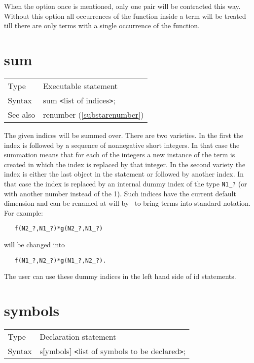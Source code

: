 When the option once is mentioned, only one pair will be contracted this 
way. Without this option all occurrences of the function inside a term will 
be treated till there are only terms with a single occurrence of the 
function.
\vspace{10mm}
%

\section{sum}
\label{substasum}

\noindent \begin{tabular}{ll}
Type & Executable statement\\
Syntax & sum {\tt<}list of indices{\tt>};
\\ See also & renumber (\ref{substarenumber})
\end{tabular}\vspace{4mm}

\noindent The given indices will be summed over. There are two 
varieties. In the first the index is followed by a sequence of nonnegative 
short integers. In that case the summation means that for each of the 
integers a new instance of the term is created in which the index is 
replaced by that integer. In the second variety the index is either the 
last object in the statement or followed by another index. In that case the 
index is replaced by an internal dummy 
index of the type \verb:N1_?: (or with another number 
instead of the 1). Such indices have the current
default dimension and can 
be renamed at will by \FORM\ to bring terms into standard notation. For 
example:
\begin{verbatim}
   f(N2_?,N1_?)*g(N2_?,N1_?)
\end{verbatim}
will be changed into
\begin{verbatim}
   f(N1_?,N2_?)*g(N1_?,N2_?).
\end{verbatim}
The user can use these dummy indices in the left hand side of 
id statements.
\vspace{10mm}

 
\section{symbols}
\label{substasymbols}

\noindent \begin{tabular}{ll}
Type & Declaration statement\\
Syntax & s[ymbols] {\tt<}list of symbols to be declared{\tt>};
\end{tabular}\vspace{4mm}


